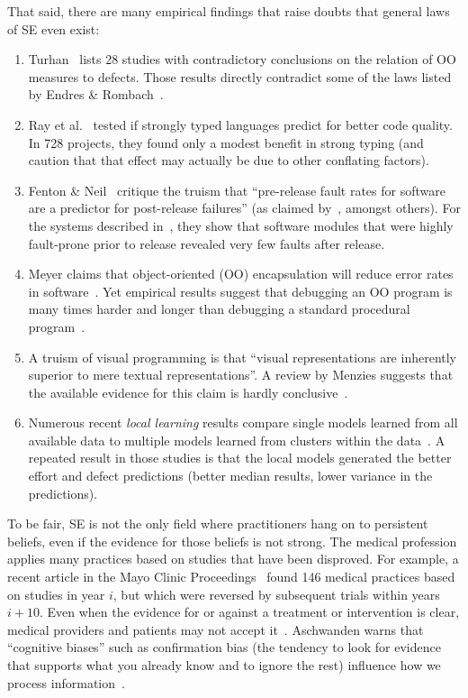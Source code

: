 \documentclass{sig-alternate}
\newcommand{\be}{\begin{enumerate}}
\newcommand{\ee}{\end{enumerate}}
\begin{document}
That said, there are many empirical  findings that 
raise doubts that   general laws of SE even exist:
\be
\item
Turhan~\cite{me12d} lists 28 studies with contradictory conclusions
on the relation of OO measures to defects.  Those results
 directly  contradict some of the laws listed by 
Endres \& Rombach~\cite{endres03}.
\item
Ray et al.~\cite{ray2014lang} tested if   strongly typed languages
predict for better code quality. In  728 projects,
they found  only a modest benefit in strong typing
(and caution that that effect may actually be due to other  conflating factors).
\item
Fenton \& Neil~\cite{fenton00,fenton00b}   critique the truism that
``pre-release fault rates for software
are a predictor for post-release failures'' (as claimed by~\cite{dunsmore88},
amongst others). For the systems described in~\cite{fenton97}, they
show that software modules that were highly fault-prone
prior to release revealed very few faults after release.
\item
Meyer claims that   object-oriented (OO) encapsulation will
reduce error rates in software~\cite{Meyer1988}.  Yet empirical results suggest
that debugging an OO program is many times harder and
longer than debugging a standard procedural program~\cite{hatton98}.
\item
A truism of visual programming is that ``visual
representations are inherently superior to mere textual representations''. A review by Menzies suggests that the available
evidence for this claim is hardly conclusive~\cite{me00v}. 
\item
Numerous recent {\em local learning} results compare single models
learned from all available data to multiple models learned from clusters within the data~\cite{betten14,yang11,yang13,minku13,me12d,me11m,betta12,posnett11}.
A repeated result in those studies is that the local models generated the better effort
and defect predictions (better median results,
lower variance in the predictions).
\ee
To be fair, 
SE is  not the only
field where practitioners hang on to persistent beliefs, even if the evidence
for those beliefs is not strong.
The medical profession applies  many practices based on studies
that have been disproved. For example,
a  recent article
in the Mayo Clinic Proceedings~\cite{prasad13} found  
146 medical practices based on studies 
in year $i$, but which were  reversed by subsequent trials within years $i+10$.
Even when the evidence for or against a treatment or intervention is clear, medical providers and patients may not accept it~\cite{aschwanden10}.
Aschwanden warns that ``cognitive biases''  such as  confirmation bias (the tendency to look for evidence that supports what you already know and to ignore the rest)  influence how we process information~\cite{aschwanden15}.
\end{document}
